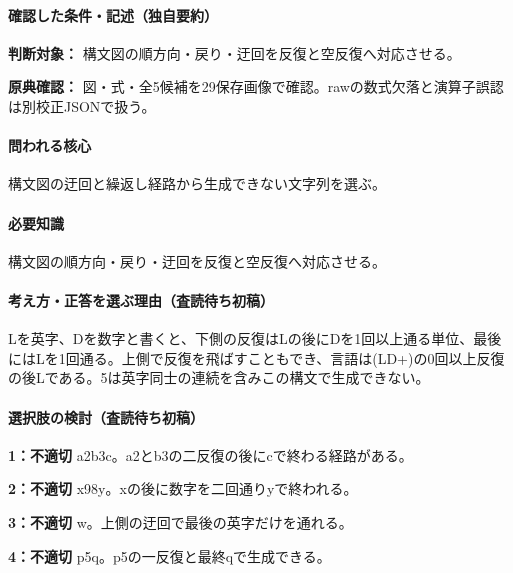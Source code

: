 \paragraph{確認した条件・記述（独自要約）}\mbox{}\par

\noindent\textbf{判断対象：} 構文図の順方向・戻り・迂回を反復と空反復へ対応させる。\par

\noindent\textbf{原典確認：} 図・式・全5候補を29保存画像で確認。rawの数式欠落と演算子誤認は別校正JSONで扱う。\par

\paragraph{問われる核心} 構文図の迂回と繰返し経路から生成できない文字列を選ぶ。

\paragraph{必要知識} 構文図の順方向・戻り・迂回を反復と空反復へ対応させる。

\paragraph{考え方・正答を選ぶ理由（査読待ち初稿）} Lを英字、Dを数字と書くと、下側の反復はLの後にDを1回以上通る単位、最後にはLを1回通る。上側で反復を飛ばすこともでき、言語は(LD+)の0回以上反復の後Lである。5は英字同士の連続を含みこの構文で生成できない。

\paragraph{選択肢の検討（査読待ち初稿）}\mbox{}\par

\noindent\textbf{1：不適切} a2b3c。a2とb3の二反復の後にcで終わる経路がある。\par

\noindent\textbf{2：不適切} x98y。xの後に数字を二回通りyで終われる。\par

\noindent\textbf{3：不適切} w。上側の迂回で最後の英字だけを通れる。\par

\noindent\textbf{4：不適切} p5q。p5の一反復と最終qで生成できる。\par


